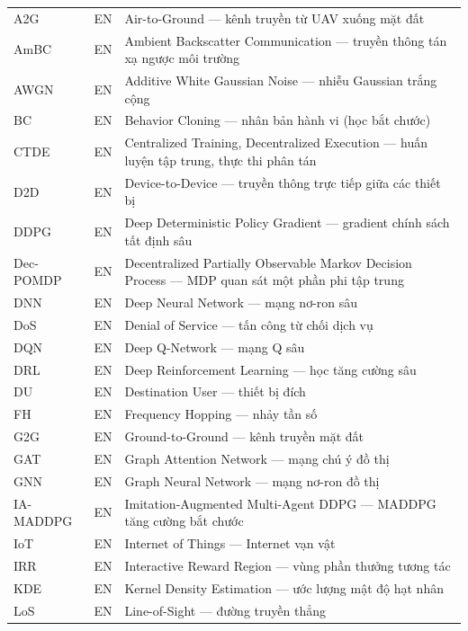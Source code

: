 \begin{longtable}{@{}p{3.8cm}p{1.5cm}p{9.2cm}@{}}
A2G       & EN & Air-to-Ground --- kênh truyền từ UAV xuống mặt đất \\[3pt]
AmBC      & EN & Ambient Backscatter Communication --- truyền thông tán xạ ngược môi trường \\[3pt]
AWGN      & EN & Additive White Gaussian Noise --- nhiễu Gaussian trắng cộng \\[3pt]
BC        & EN & Behavior Cloning --- nhân bản hành vi (học bắt chước) \\[3pt]
CTDE      & EN & Centralized Training, Decentralized Execution --- huấn luyện tập trung, thực thi phân tán \\[3pt]
D2D       & EN & Device-to-Device --- truyền thông trực tiếp giữa các thiết bị \\[3pt]
DDPG      & EN & Deep Deterministic Policy Gradient --- gradient chính sách tất định sâu \\[3pt]
Dec-POMDP & EN & Decentralized Partially Observable Markov Decision Process --- MDP quan sát một phần phi tập trung \\[3pt]
DNN       & EN & Deep Neural Network --- mạng nơ-ron sâu \\[3pt]
DoS       & EN & Denial of Service --- tấn công từ chối dịch vụ \\[3pt]
DQN       & EN & Deep Q-Network --- mạng Q sâu \\[3pt]
DRL       & EN & Deep Reinforcement Learning --- học tăng cường sâu \\[3pt]
DU        & EN & Destination User --- thiết bị đích \\[3pt]
FH        & EN & Frequency Hopping --- nhảy tần số \\[3pt]
G2G       & EN & Ground-to-Ground --- kênh truyền mặt đất \\[3pt]
GAT       & EN & Graph Attention Network --- mạng chú ý đồ thị \\[3pt]
GNN       & EN & Graph Neural Network --- mạng nơ-ron đồ thị \\[3pt]
IA-MADDPG & EN & Imitation-Augmented Multi-Agent DDPG --- MADDPG tăng cường bắt chước \\[3pt]
IoT       & EN & Internet of Things --- Internet vạn vật \\[3pt]
IRR       & EN & Interactive Reward Region --- vùng phần thưởng tương tác \\[3pt]
KDE       & EN & Kernel Density Estimation --- ước lượng mật độ hạt nhân \\[3pt]
LoS       & EN & Line-of-Sight --- đường truyền thẳng \\[3pt]

\end{longtable}
